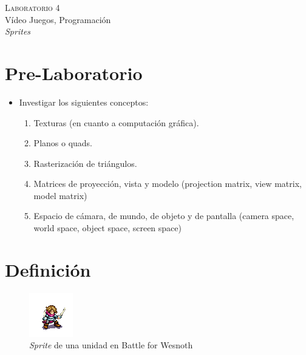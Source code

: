 \begin{center}
\textsc{\Large Laboratorio 4}~\\
{\large Vídeo Juegos, Programación}~\\
\emph{Sprites}
\end{center}

\section{Pre-Laboratorio}
\begin{itemize}
\item Investigar los siguientes conceptos:
\begin{enumerate}
  \item Texturas (en cuanto a computación gráfica).
  \item Planos o quads.
  \item Rasterización de triángulos.
  \item Matrices de proyección, vista y modelo (projection matrix, view matrix, model matrix)
  \item Espacio de cámara, de mundo, de objeto y de pantalla (camera space, world space, object space, screen space)
\end{enumerate}
\end{itemize}
\section{Definición}
\setlength\intextsep{0pt}
\begin{figure}
\includegraphics[width=\linewidth]{media/sprite_ej1.png} 
\caption{\emph{Sprite} de una unidad en Battle for Wesnoth \cite{wesnothgame}}
\end{figure}

